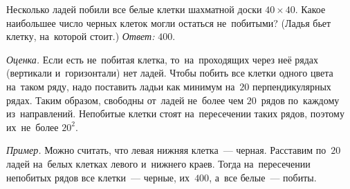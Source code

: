 \problem
Несколько ладей побили все белые клетки шахматной доски $40 \times 40$.
Какое наибольшее число черных клеток могли остаться не~побитыми?
(Ладья бьет клетку, на~которой стоит.)
\solution
\emph{Ответ:} $400$.
\par
\emph{Оценка.}
Если есть не~побитая клетка, то~на~проходящих через неё рядах (вертикали
и~горизонтали) нет ладей.
Чтобы побить все клетки одного цвета на~таком ряду, надо поставить ладьи как
минимум на~$20$ перпендикулярных рядах.
Таким образом, свободны от~ладей не~более чем $20$~рядов по~каждому
из~направлений.
Непобитые клетки стоят на~пересечении таких рядов, поэтому их~не~более $20^2$.
\par
\emph{Пример.}
Можно считать, что левая нижняя клетка~--- черная.
Расставим по~$20$ ладей на~белых клетках левого и~нижнего краев.
Тогда на~пересечении непобитых рядов все клетки~--- черные, их~$400$, а~все
белые~--- побиты.
\endproblem
